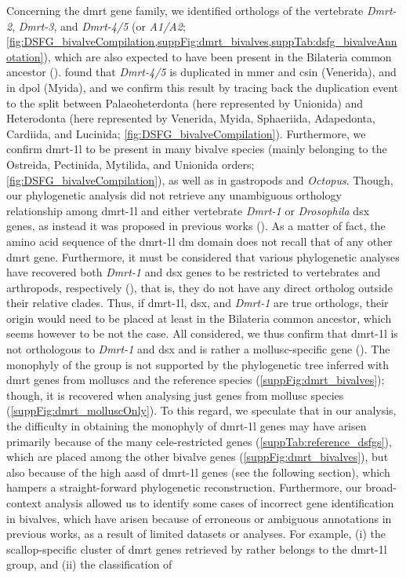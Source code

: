 Concerning the \gls{dmrt} gene family, we identified orthologs of the vertebrate \textit{Dmrt-2}, \textit{Dmrt-3}, and \textit{Dmrt-4/5} (or \textit{A1/A2}; \cref{fig:DSFG_bivalveCompilation,suppFig:dmrt_bivalves,suppTab:dsfg_bivalveAnnotation}), which are also expected to have been present in the Bilateria common ancestor (\textbf{\cite{mawaribuchi2019independent}}). \textbf{\cite{wang2023genome}} found that \textit{Dmrt-4/5} is duplicated in \gls{mmer} and \gls{csin} (Venerida), and in \gls{dpol} (Myida), and we confirm this result by tracing back the duplication event to the split between Palaeoheterdonta (here represented by Unionida) and Heterodonta (here represented by Venerida, Myida, Sphaeriida, Adapedonta, Cardiida, and Lucinida; \cref{fig:DSFG_bivalveCompilation}). Furthermore, we confirm \gls{dmrt-1l} to be present in many bivalve species (mainly belonging to the Ostreida, Pectinida, Mytilida, and Unionida orders; \cref{fig:DSFG_bivalveCompilation}), as well as in gastropods and \textit{Octopus}. Though, our phylogenetic analysis did not retrieve any unambiguous orthology relationship among \gls{dmrt-1l} and either vertebrate \textit{Dmrt-1} or \textit{Drosophila} \gls{dsx} genes, as instead it was proposed in previous works (\textbf{\cite{li2018foxl2,evensen2022comparative}}). As a matter of fact, the amino acid sequence of the \gls{dmrt-1l} \gls{dm} domain does not recall that of any other \gls{dmrt} gene. Furthermore, it must be considered that various phylogenetic analyses have recovered both \textit{Dmrt-1} and \gls{dsx} genes to be restricted to vertebrates and arthropods, respectively (\textbf{\cite{wexler2014pan,mawaribuchi2019independent,panara2019phylogenetic}}), that is, they do not have any direct ortholog outside their relative clades. Thus, if \gls{dmrt-1l}, \gls{dsx}, and \textit{Dmrt-1} are true orthologs, their origin would need to be placed at least in the Bilateria common ancestor, which seems however to be not the case. All considered, we thus confirm that \gls{dmrt-1l} is not orthologous to \textit{Dmrt-1} and \gls{dsx} and is rather a mollusc-specific gene (\textbf{\cite{evensen2022comparative}}). The monophyly of the group is not supported by the phylogenetic tree inferred with \gls{dmrt} genes from molluscs and the reference species (\cref{suppFig:dmrt_bivalves}); though, it is recovered when analysing just genes from mollusc species (\cref{suppFig:dmrt_molluscOnly}). To this regard, we speculate that in our analysis, the difficulty in obtaining the monophyly of \gls{dmrt-1l} genes may have arisen primarily because of the many \gls{cele}-restricted genes (\cref{suppTab:reference_dsfgs}), which are placed among the other bivalve genes (\cref{suppFig:dmrt_bivalves}), but also because of the high \gls{aasd} of \gls{dmrt-1l} genes (see the following section), which hampers a straight-forward phylogenetic reconstruction. Furthermore, our broad-context analysis allowed us to identify some cases of incorrect gene identification in bivalves, which have arisen because of erroneous or ambiguous annotations in previous works, as a result of limited datasets or analyses. For example, (i) the scallop-specific cluster of \gls{dmrt} genes retrieved by \textbf{\cite{wang2023genome}} rather belongs to the \gls{dmrt-1l} group, and (ii) the classification of 